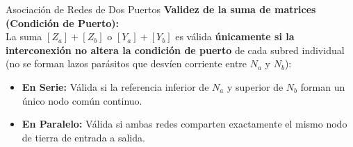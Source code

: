 \documentclass[10pt, aspectratio=169]{beamer}
\begin{document}
\begin{frame}{Asociación de Redes de Dos Puertos}
    \vspace{0.2cm}
    \textbf{Validez de la suma de matrices (Condición de Puerto):} \\
    La suma $[Z_a]+[Z_b]$ o $[Y_a]+[Y_b]$ es válida \textbf{únicamente si la interconexión no altera la condición de puerto} de cada subred individual (no se forman lazos parásitos que desvíen corriente entre $N_a$ y $N_b$):
    \begin{itemize}
        \item \textbf{En Serie:} Válida si la referencia inferior de $N_a$ y superior de $N_b$ forman un único nodo común continuo.
        \item \textbf{En Paralelo:} Válida si ambas redes comparten exactamente el mismo nodo de tierra de entrada a salida.
    \end{itemize}
\end{frame}
\end{document}
